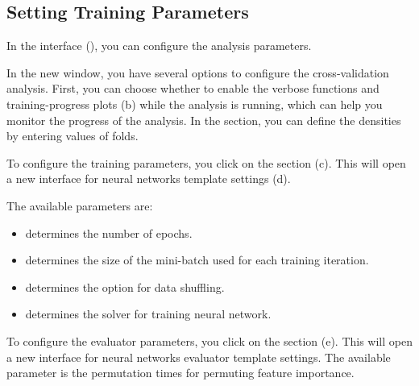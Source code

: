 \documentclass[justified]{tufte-handout}
\begin{document}
{\subsection{Setting Training Parameters}

In the  interface (), you can configure the analysis parameters.

In the new window, you have several options to configure the cross-validation analysis. First, you can choose whether to enable the verbose functions and training-progress plots (b) while the analysis is running, which can help you monitor the progress of the analysis. 
In the  section, you can define the densities by entering values of folds.

To configure the training parameters, you click on the section  (c). This will open a new interface for neural networks template settings (d). 

The available parameters are:
\begin{itemize}
	\item {} determines the number of epochs.
	\item {} determines the size of the mini-batch used for each training iteration.
	\item {} determines the option for data shuffling.
	\item {} determines the solver for training neural network.
\end{itemize}

To configure the evaluator parameters, you click on the section  (e). This will open a new interface for neural networks evaluator template settings. 
The available parameter is the permutation times for permuting feature importance.

}
\end{document}

